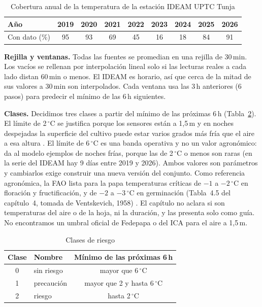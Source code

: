 \documentclass[conference]{IEEEtran}
\begin{document}
\begin{table}[t]
\caption{Cobertura anual de la temperatura de la estaci\'on IDEAM UPTC Tunja}
\label{tab:cob}
\centering
\footnotesize\setlength{\tabcolsep}{2.5pt}
\begin{tabular}{@{}lcccccccc@{}}
\toprule
A\~no & 2019 & 2020 & 2021 & 2022 & 2023 & 2024 & 2025 & 2026 \\
\midrule
Con dato (\%) & 95 & 93 & 69 & 45 & 16 & 18 & 84 & 91 \\
\bottomrule
\end{tabular}
\end{table}

\textbf{Rejilla y ventanas.} Todas las fuentes se promedian en una rejilla de 30\,min. Los vac\'ios se rellenan por interpolaci\'on lineal solo si las lecturas reales a cada lado distan 60\,min o menos. El IDEAM es horario, as\'i que cerca de la mitad de sus valores a 30\,min son interpolados. Cada ventana usa las 3\,h anteriores (6 pasos) para predecir el m\'inimo de las 6\,h siguientes.

\textbf{Clases.} Decidimos tres clases a partir del m\'inimo de las pr\'oximas 6\,h (Tabla~\ref{tab:clases}). El l\'imite de 2\,$^\circ$C se justifica porque los sensores est\'an a 1,5\,m y en noches despejadas la superficie del cultivo puede estar varios grados m\'as fr\'ia que el aire a esa altura \cite{fao_frost}. El l\'imite de 6\,$^\circ$C es una banda operativa y no un valor agron\'omico: da al modelo ejemplos de noches fr\'ias, porque las de 2\,$^\circ$C o menos son raras (en la serie del IDEAM hay 9 d\'ias entre 2019 y 2026). Ambos valores son par\'ametros y cambiarlos exige construir una nueva versi\'on del conjunto. Como referencia agron\'omica, la FAO lista para la papa temperaturas cr\'iticas de $-1$ a $-2$\,$^\circ$C en floraci\'on y fructificaci\'on, y de $-2$ a $-3$\,$^\circ$C en germinaci\'on (Tabla~4.5 del cap\'itulo~4, tomada de Ventskevich, 1958) \cite{fao_frost}. El cap\'itulo no aclara si son temperaturas del aire o de la hoja, ni la duraci\'on, y las presenta solo como gu\'ia. No encontramos un umbral oficial de Fedepapa o del ICA para el aire a 1,5\,m.

\begin{table}[t]
\caption{Clases de riesgo}
\label{tab:clases}
\centering
\begin{tabular}{@{}clc@{}}
\toprule
Clase & Nombre & M\'inimo de las pr\'oximas 6\,h \\
\midrule
0 & sin riesgo & mayor que 6\,$^\circ$C \\
1 & precauci\'on & mayor que 2 y hasta 6\,$^\circ$C \\
2 & riesgo & hasta 2\,$^\circ$C \\
\bottomrule
\end{tabular}
\end{table}
\end{document}

